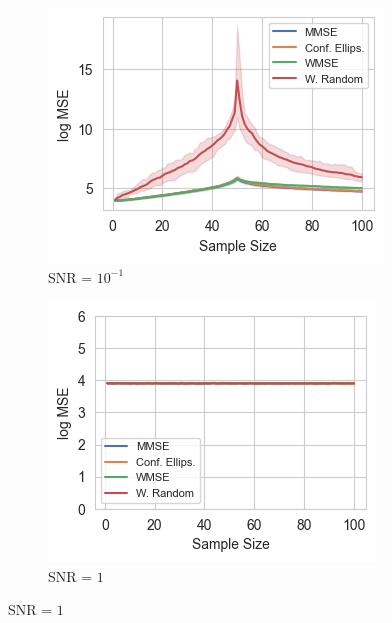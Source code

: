 \begin{figure}%
    \centering
    \begin{subfigure}{0.3\columnwidth}
    \includegraphics[width=\columnwidth]{figures/proj1/LS_MSE_bl_old/BA_3_500_bandwidth_50_SNRdbs_-10.0_samps_100_MSE_LS.png}
    \caption{SNR = $10^{-1}$}
    \label{bandlimited_BA_MSE_subfiga}
    \end{subfigure}\hfill
    \begin{subfigure}{0.3\columnwidth}
    \includegraphics[width=\columnwidth]{figures/proj1/plots/LS_MSE/BA_3_500_bandwidth_50_SNRdbs_0.0_samps_100_bl_MSE_LS.png}
    \caption{SNR = $1$}%
    \label{bandlimited_BA_MSE_subfigb}%

\end{subfigure}
\end{figure}

